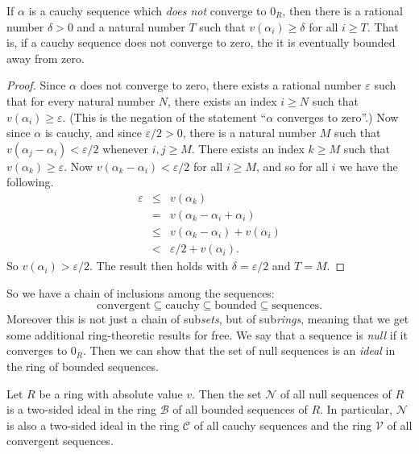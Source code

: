 \begin{prop} \label{prop:cauchy-bound-away-from-zero}
If \(\alpha\) is a cauchy sequence which \emph{does not} converge to \(0_R\), then there is a rational number \(\delta > 0\) and a natural number \(T\) such that \(v(\alpha_i) \geq \delta\) for all \(i \geq T\).
That is, if a cauchy sequence does not converge to zero, the it is eventually bounded away from zero.
\end{prop}

\begin{proof}
Since \(\alpha\) does not converge to zero, there exists a rational number \(\varepsilon\) such that for every natural number \(N\), there exists an index \(i \geq N\) such that \(v(\alpha_i) \geq \varepsilon\).
(This is the negation of the statement ``\(\alpha\) converges to zero''.)
Now since \(\alpha\) is cauchy, and since \(\varepsilon/2 > 0\), there is a natural number \(M\) such that \(v(\alpha_j - \alpha_i) < \varepsilon/2\) whenever \(i,j \geq M\).
There exists an index \(k \geq M\) such that \(v(\alpha_k) \geq \varepsilon\).
Now \(v(\alpha_k - \alpha_i) < \varepsilon/2\) for all \(i \geq M\), and so for all \(i\) we have the following.
\begin{eqnarray*}
\varepsilon & \leq & v(\alpha_k) \\
 & = & v(\alpha_k - \alpha_i + \alpha_i) \\
 & \leq & v(\alpha_k - \alpha_i) + v(\alpha_i) \\
 & < & \varepsilon/2 + v(\alpha_i).
\end{eqnarray*}
So \(v(\alpha_i) > \varepsilon/2\).
The result then holds with \(\delta = \varepsilon/2\) and \(T = M\).
\end{proof}

So we have a chain of inclusions among the sequences: \[ \mathrm{convergent} \subseteq \mathrm{cauchy} \subseteq \mathrm{bounded} \subseteq \mathrm{sequences}. \]
Moreover this is not just a chain of sub\emph{sets}, but of sub\emph{rings}, meaning that we get some additional ring-theoretic results for free.
We say that a sequence is \emph{null} if it converges to \(0_R\).
Then we can show that the set of null sequences is an \emph{ideal} in the ring of bounded sequences.

\begin{prop}
Let \(R\) be a ring with absolute value \(v\).
Then the set \(\mathcal{N}\) of all null sequences of \(R\) is a two-sided ideal in the ring \(\mathcal{B}\) of all bounded sequences of \(R\).
In particular, \(\mathcal{N}\) is also a two-sided ideal in the ring \(\mathcal{C}\) of all cauchy sequences and the ring \(\mathcal{V}\) of all convergent sequences.
\end{prop}


